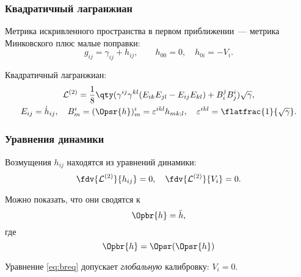 \documentclass[compress]{beamer}
\begin{document}
    \begin{frame}\frametitle{Квадратичный лагранжиан}

        Метрика искривленного пространства в первом приближении~--- метрика Минковского плюс малые поправки:
        \begin{equation*}
            g_{ij} = \gamma_{ij} + h_{ij}, \qquad h_{00} = 0, \quad h_{0i} = -V_i .
        \end{equation*}

        Квадратичный лагранжиан:
        \begin{equation}\begin{gathered}\label{eq:lagr}
            \mathcal{L}^{(2)} = \frac{1}{8} \qty(
                \gamma^{ij}\gamma^{kl} (E_{ik}E_{jl} - E_{ij}E_{kl}) + B_i^j B_j^i
            ) \sqrt{\gamma} , \\
            E_{ij} = \dot{h}_{ij}, \quad
            B^i_m = (\Opsr{h})^i_m = \varepsilon^{ikl} h_{mk;l}, \quad
            \varepsilon^{ikl} = \flatfrac{1}{\sqrt{\gamma}}.
        \end{gathered}\end{equation}

    \end{frame}


    \begin{frame}\frametitle{Уравнения динамики}

        Возмущения $h_{ij}$ находятся из уравнений динамики:
        \begin{equation*}
            \fdv{\mathcal{L}^{(2)}}{h_{ij}} = 0, \quad
            \fdv{\mathcal{L}^{(2)}}{V_i} = 0 .
        \end{equation*}

        Можно показать, что они сводятся к
        \begin{equation}\label{eq:breq}
            \Opbr{h} = \ddot{h} ,
        \end{equation}
        где
        \begin{equation*}
            \Opbr{h} = \Opsr(\Opsr{h})
        \end{equation*}

        Уравнение \autoref{eq:breq} допускает \textit{глобальную} калибровку: $V_i = 0$.

    \end{frame}
\end{document}
